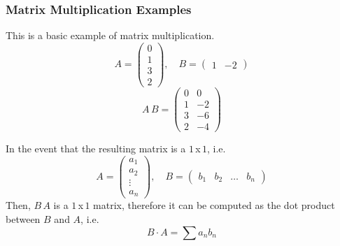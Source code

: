 \documentclass[diffeq.tex]{subfiles}
\begin{document}
    \subsubsection{Matrix Multiplication Examples}
    \begin{example}
        This is a basic example of matrix multiplication.
        \begin{equation}
            A = \begin{pmatrix}
                0\\1\\3\\2
            \end{pmatrix},\quad B = \begin{pmatrix}
                1 & -2
            \end{pmatrix}
        \end{equation}
        \begin{equation}
            A\,B = \begin{pmatrix}
                0 & 0\\
                1 & -2\\
                3 & -6\\
                2 & -4
            \end{pmatrix}
        \end{equation}
    \end{example}
    \begin{example}
        In the event that the resulting matrix is a $1$\,x\,$1$, i.e.
        \begin{equation}
            A = \begin{pmatrix}
                a_{1}\\
                a_{2}\\
                \vdots\\
                a_{n}
            \end{pmatrix},\quad
            B = \begin{pmatrix}
                b_{1} & b_{2} & \dots & b_{n}
            \end{pmatrix}
        \end{equation}
        Then, $B\,A$ is a $1$\,x\,$1$ matrix, therefore it can be computed as the dot product between $B$ and $A$, i.e.
        \begin{equation}
            B \cdot A = \sum a_{n}b_{n}
        \end{equation}
    \end{example}
\end{document}
